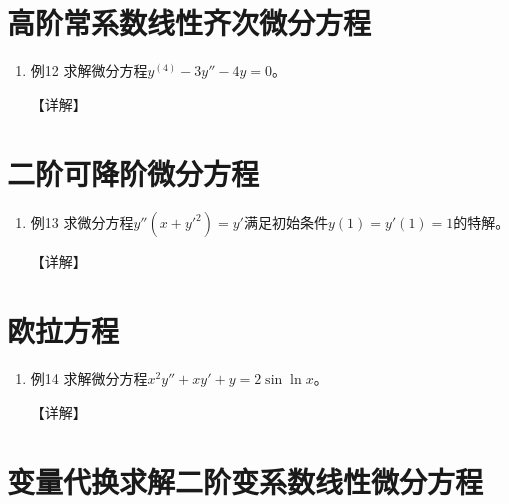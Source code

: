 \documentclass[12pt, a4paper, oneside, UTF8]{ctexbook}
\begin{document}
\section{ 高阶常系数线性齐次微分方程}

\begin{enumerate}[label=\arabic*.,start=12]
    \item 例12 求解微分方程$y^{(4)}-3y''-4y=0$。
    
    \begin{solution}
    【详解】
    \end{solution}
\end{enumerate}

\section{ 二阶可降阶微分方程}

\begin{remark}
\end{remark}

\begin{enumerate}[label=\arabic*.,start=13]
    \item 例13 求微分方程$y''(x+y'^2)=y'$满足初始条件$y(1)=y'(1)=1$的特解。
    
    \begin{solution}
    【详解】
    \end{solution}
\end{enumerate}

\section{ 欧拉方程}

\begin{remark}
\end{remark}

\begin{enumerate}[label=\arabic*.,start=14]
    \item 例14 求解微分方程$x^2y''+xy'+y=2\sin\ln x$。
    
    \begin{solution}
    【详解】
    \end{solution}
\end{enumerate}

\section{ 变量代换求解二阶变系数线性微分方程}
\end{document}
